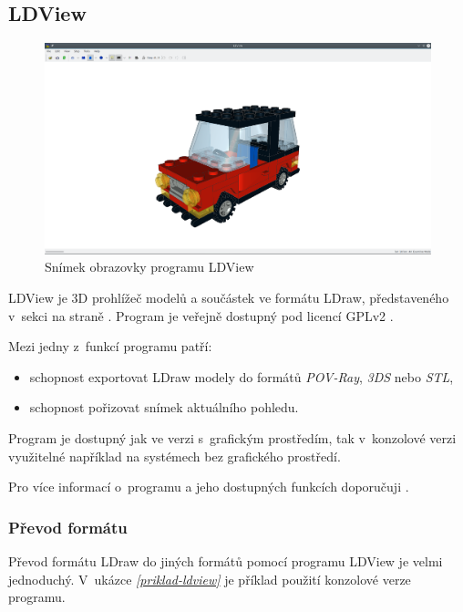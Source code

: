 \subsection{LDView}\label{podsekce-ldview}
\begin{figure}[htbp]
        \centering
        \includegraphics[width=\textwidth,height=\textheight,keepaspectratio]{images/ldview.png}
        \caption{Snímek obrazovky programu LDView}
\end{figure}

LDView je 3D prohlížeč modelů a součástek ve formátu LDraw, představeného v~sekci \emph{} na straně \emph{\pageref{ldraw-format}}. Program je veřejně dostupný pod licencí \gls{GPLv2} \autocite{GPLv2}.

Mezi jedny z~funkcí programu patří: 
\begin{itemize}
    \item schopnost exportovat LDraw modely do formátů \textit{POV-Ray}, \textit{3DS} nebo \textit{STL},
    \item schopnost pořizovat snímek aktuálního pohledu.
\end{itemize}

Program je dostupný jak ve verzi s~grafickým prostředím, tak v~konzolové verzi využitelné například na systémech bez grafického prostředí.

Pro více informací o~programu a jeho dostupných funkcích doporučuji \autocite{ldview}.

\subsubsection*{Převod formátu}

Převod formátu LDraw do jiných formátů pomocí programu LDView je velmi jednoduchý. V~ukázce \emph{\ref{priklad-ldview}} je příklad použití konzolové verze programu. 

